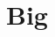 \documentclass[oneside,14pt]{memoir} %
\begin{document}
\part{Big}

\setlength{\parindent}{0em}

\newcommand{\chaptersvar}{chapters.tex}


\end{document}
